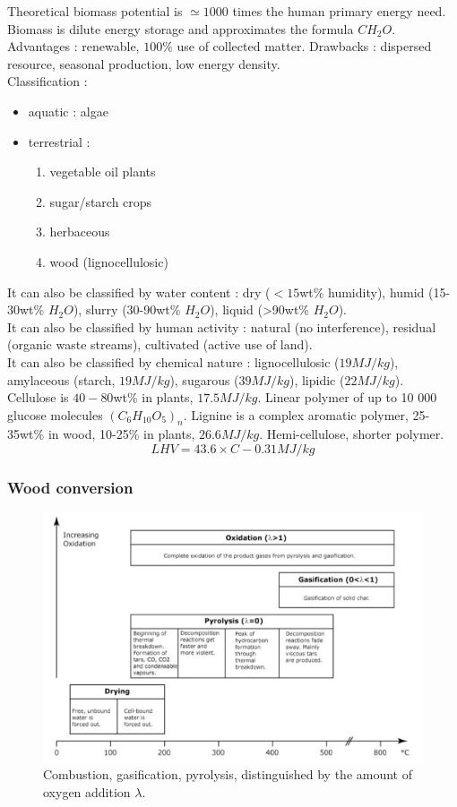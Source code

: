 \documentclass[../main.tex]{subfiles}
\begin{document}
\warning Theoretical biomass potential is $\simeq 1000$ times the human primary energy need. 
Biomass is dilute energy storage and approximates the formula $CH_2O$. \\

Advantages : renewable, $100\%$ use of collected matter. Drawbacks : dispersed resource, seasonal production, low energy density.\\

Classification : \begin{itemize}
    \item aquatic : algae
    \item terrestrial : \begin{enumerate}
        \item vegetable oil plants
        \item sugar/starch crops
        \item herbaceous
        \item wood (lignocellulosic)
    \end{enumerate}
\end{itemize}
It can also be classified by water content : dry ($<15$wt\% humidity), humid (15-30wt\% $H_2O$), slurry (30-90wt\% $H_2O$), liquid (>90wt\% $H_2O$).\\
It can also be classified by human activity : natural (no interference), residual (organic waste streams), cultivated (active use of land).\\
It can also be classified by chemical nature : lignocellulosic ($19MJ/kg$), amylaceous (starch, $19MJ/kg$), sugarous ($39MJ/kg$), lipidic ($22MJ/kg$).\\

Cellulose is $40-80$wt\% in plants, $17.5MJ/kg$. Linear polymer of up to 10 000 glucose molecules $(C_6H_{10} O_5)_n$. Lignine is a complex aromatic polymer, 25-35wt\% in wood, 10-25\% in plants, $26.6MJ/kg$. Hemi-cellulose, shorter polymer. \\
\begin{equation}
    LHV = 43.6\times C - 0.31 MJ/kg
\end{equation}

\subsubsection{Wood conversion}
\begin{figure}[hbt!]
    \centering
    \includegraphics[width=0.5\linewidth]{IMAGES/Renewable/Screenshot from 2025-04-15 23-00-58.png}
    \caption{Combustion, gasification, pyrolysis, distinguished by the amount of oxygen addition $\lambda$.}
\end{figure}
\end{document}
